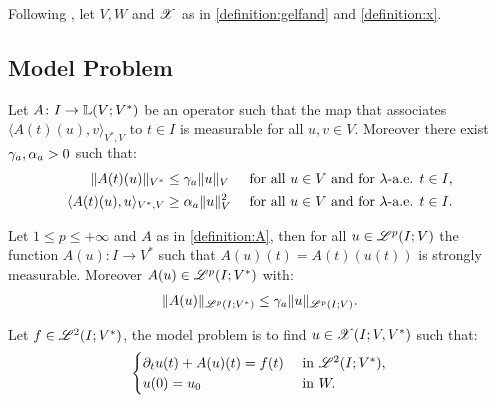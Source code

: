 Following \cite[p.~124]{Ern2021}, let $V, W$ and $\mathscr{X}$ as in \cref{definition:gelfand} and \cref{definition:x}.

\subsection{Model Problem}

\begin{definition}[$A$] \label{definition:A} %
    Let $A \colon I \rightarrow \mathbb{L}(V;V^*)$ be an operator such that the map that associates $\langle A(t)(u), v \rangle_{V^*, V}$ to $t \in I$ is measurable for all $u, v \in V$. Moreover there exist $\gamma_{a}, \alpha_{a} > 0$ such that:
    \begin{align} \label{equation:a}
        \lVert A(t)(u) \rVert_{V^*} & \leq \gamma_{a} \lVert u \rVert_V &\text{ for all } u \in V \text{ and for } \lambda \text{-a.e. } t \in I, \\
        \langle A(t)(u), u \rangle_{V^*, V} & \geq \alpha_{a} \lVert u \rVert_V^2 &\text{ for all } u \in V \text{ and for } \lambda \text{-a.e. } t \in I.
    \end{align}
\end{definition}

\begin{lemma}
    Let $1 \leq p \leq +\infty$ and  $A$ as in \cref{definition:A}, then for all $u \in \mathscr{L}^{p}(I; V)$ the function $A(u) \colon I \rightarrow V^*$ such that $A(u)(t) = A(t)(u(t))$ is strongly measurable. Moreover $A(u) \in \mathscr{L}^{p}(I; V^*)$ with:
    \begin{align}
        \lVert A(u) \rVert_{\mathscr{L}^{p}(I; V^*)} \leq \gamma_{a} \lVert u \rVert_{\mathscr{L}^{p}(I; V)}.
    \end{align}
\end{lemma}

\begin{definition}
    Let $f \in \mathscr{L}^{2}(I; V^*)$, the model problem is to find $u \in \mathscr{X}(I; V, V^*)$ such that:
    \begin{align}
        \begin{cases} \label{equation:model}
            \partial_t u(t) + A(u)(t) = f(t) & \text{ in } \mathscr{L}^{2}(I; V^*), \\
            u(0) = u_0 & \text{ in } W.
        \end{cases}
    \end{align}
\end{definition}

